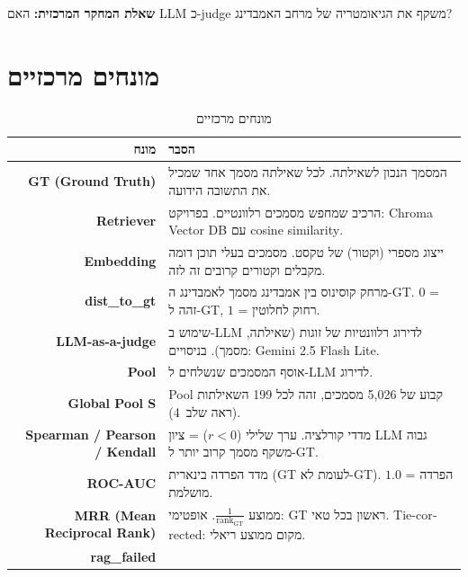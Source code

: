 \documentclass[12pt, a4paper]{article}
\begin{document}
\begin{center}
\large\textbf{שאלת המחקר המרכזית:} האם \textenglish{LLM} כ-\textenglish{judge} משקף את הגיאומטריה של מרחב האמבדינג?
\end{center}

\section{מונחים מרכזיים}

\begin{table}[H]
\centering
\caption{מונחים מרכזיים}
\begin{tabular}{>{\bfseries}rp{10cm}}
\toprule
מונח & הסבר \\
\midrule
\textenglish{GT (Ground Truth)}
  & המסמך הנכון לשאילתה. לכל שאילתה מסמך אחד שמכיל את התשובה הידועה. \\[4pt]
\textenglish{Retriever}
  & הרכיב שמחפש מסמכים רלוונטיים. בפרויקט: \textenglish{Chroma Vector DB} עם \textenglish{cosine similarity}. \\[4pt]
\textenglish{Embedding}
  & ייצוג מספרי (וקטור) של טקסט. מסמכים בעלי תוכן דומה מקבלים וקטורים קרובים זה לזה. \\[4pt]
\textenglish{dist\_to\_gt}
  & מרחק קוסינוס בין אמבדינג מסמך לאמבדינג ה-\textenglish{GT}. $0$ = זהה ל-\textenglish{GT}, $1$ = רחוק לחלוטין. \\[4pt]
\textenglish{LLM-as-a-judge}
  & שימוש ב-\textenglish{LLM} לדירוג רלוונטיות של זוגות (שאילתה, מסמך). בניסויים: \textenglish{Gemini 2.5 Flash Lite}. \\[4pt]
\textenglish{Pool}
  & אוסף המסמכים שנשלחים ל-\textenglish{LLM} לדירוג. \\[4pt]
\textenglish{Global Pool S}
  & \textenglish{Pool} קבוע של 5{,}026 מסמכים, זהה לכל 199 השאילתות (ראה שלב~4). \\[4pt]
\textenglish{Spearman / Pearson / Kendall}
  & מדדי קורלציה. ערך שלילי ($r < 0$) = ציון \textenglish{LLM} גבוה משקף מסמך קרוב יותר ל-\textenglish{GT}. \\[4pt]
\textenglish{ROC-AUC}
  & מדד הפרדה בינארית (\textenglish{GT} לעומת לא-\textenglish{GT}). $1.0$ = הפרדה מושלמת. \\[4pt]
\textenglish{MRR (Mean Reciprocal Rank)}
  & ממוצע $\frac{1}{\mathrm{rank}_{\mathrm{GT}}}$. אופטימי: \textenglish{GT} ראשון בכל טאי. \textenglish{Tie-corrected}: מקום ממוצע ריאלי. \\[4pt]
\textenglish{rag\_failed}

\end{tabular}
\end{table}
\end{document}
